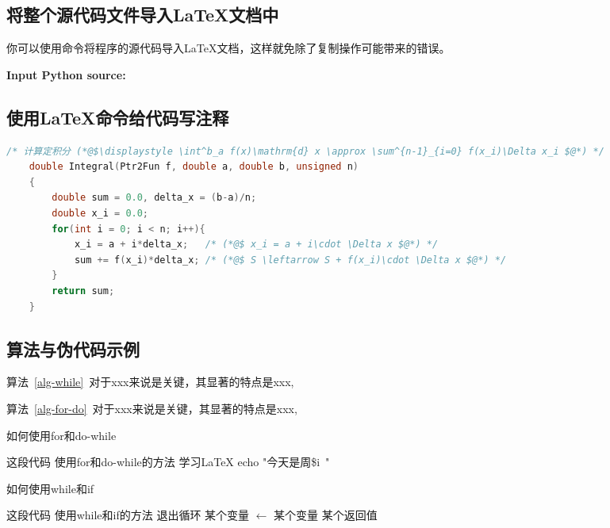 \subsection{将整个源代码文件导入\LaTeX{}文档中}
你可以使用\lstinline||命令将程序的源代码导入\LaTeX 文档，这样就免除了复制操作可能带来的错误。

\textbf{\textcolor[rgb]{0.98,0,0}{Input Python source:}}


\subsection{使用{\LaTeX{}}命令给代码写注释}

\begin{lstlisting}[language=C,frame=shadowbox,title={Integral-2.c}]
    /* 计算定积分 (*@$\displaystyle \int^b_a f(x)\mathrm{d} x \approx \sum^{n-1}_{i=0} f(x_i)\Delta x_i $@*) */
	double Integral(Ptr2Fun f, double a, double b, unsigned n)
	{
		double sum = 0.0, delta_x = (b-a)/n; 
		double x_i = 0.0;
		for(int i = 0; i < n; i++){
			x_i = a + i*delta_x;   /* (*@$ x_i = a + i\cdot \Delta x $@*) */
			sum += f(x_i)*delta_x; /* (*@$ S \leftarrow S + f(x_i)\cdot \Delta x $@*) */
		}
		return sum; 				
	}
\end{lstlisting}


\subsection{算法与伪代码示例}

算法~\ref{alg-while}~对于xxx来说是关键，其显著的特点是xxx, 

算法~\ref{alg-for-do}~对于xxx来说是关键，其显著的特点是xxx, 

\begin{breakablealgorithm}
	\caption{如何使用for和do-while} \label{alg-for-do}
	\begin{algorithmic}[1]  %
		\Require 这段代码
		\Ensure 使用for和do-while的方法
		\Repeat
		\State 学习\LaTeX
		\State echo "今天是周\$i\ "
		\EndFor
		\EndFunction
	\end{algorithmic}
\end{breakablealgorithm}

\begin{algorithm}[h]
	\caption{如何使用while和if} \label{alg-while}
	\begin{algorithmic}[1]  %
		\Require 这段代码
		\Ensure 使用while和if的方法
		\State 退出循环
		\EndIf
		\State 某个变量  $\gets$ 某个变量
		\EndWhile
		\State\Return 某个返回值
		\EndFunction
	\end{algorithmic}
\end{algorithm}


